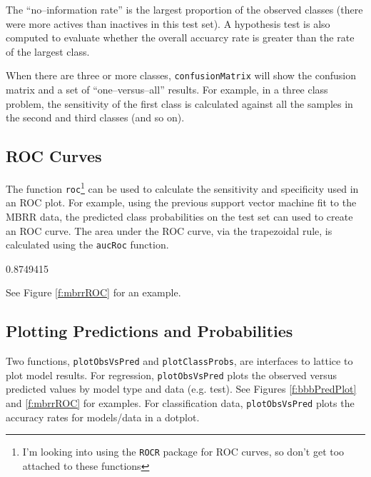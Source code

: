 \documentclass[12pt]{article}
\begin{document}
The ``no--information rate'' is the largest proportion of the observed classes (there were more actives than inactives in this test set). A hypothesis test is also computed to evaluate whether the overall accuarcy rate is greater than the rate of the largest class. 

When there are three or more classes, \texttt{confusionMatrix} will show the confusion matrix and a set of ``one--versus--all'' results. For example, in a three class problem, the sensitivity of the first class is calculated against all the samples in the second and third classes (and so on).


\subsection*{ROC Curves}

The function \texttt{roc}\footnote{I'm looking into using the \texttt{ROCR} package for ROC curves, so don't get too attached to these functions} can be used to calculate the sensitivity and specificity used in an ROC plot. For example, using the previous support vector machine fit to the MBRR data, the predicted class probabilities on the test set can used to create an ROC curve. The area under the ROC curve, via the trapezoidal rule, is calculated using the \texttt{aucRoc} function. 

\begin{small}
\begin{Schunk}
\begin{Soutput}
[1] 0.8749415
\end{Soutput}
\end{Schunk}
\end{small}

See Figure \ref{f:mbrrROC} for an example.

\subsection*{Plotting Predictions and Probabilities}

Two functions, \texttt{plotObsVsPred} and \texttt{plotClassProbs}, are interfaces to lattice to plot model results. For regression, \texttt{plotObsVsPred} plots the observed versus predicted values by model type and data (e.g. test). See Figures \ref{f:bbbPredPlot} and \ref{f:mbrrROC}  for examples. For classification data, \texttt{plotObsVsPred} plots the accuracy rates for models/data in a dotplot. 
\end{document}
